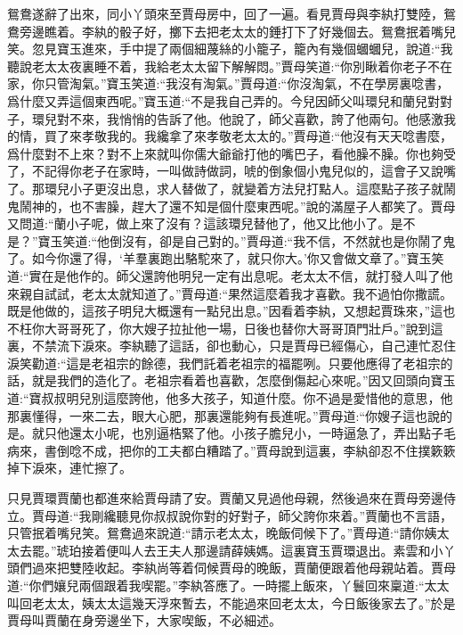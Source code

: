 \begin{parag}
    鴛鴦遂辭了出來，同小丫頭來至賈母房中，回了一遍。看見賈母與李紈打雙陸，鴛鴦旁邊瞧着。李紈的骰子好，擲下去把老太太的錘打下了好幾個去。鴛鴦抿着嘴兒笑。忽見寶玉進來，手中提了兩個細蔑絲的小籠子，籠內有幾個蟈蟈兒，說道:“我聽說老太太夜裏睡不着，我給老太太留下解解悶。”賈母笑道:“你別瞅着你老子不在家，你只管淘氣。”寶玉笑道:“我沒有淘氣。”賈母道:“你沒淘氣，不在學房裏唸書，爲什麼又弄這個東西呢。”寶玉道:“不是我自己弄的。今兒因師父叫環兒和蘭兒對對子，環兒對不來，我悄悄的告訴了他。他說了，師父喜歡，誇了他兩句。他感激我的情，買了來孝敬我的。我纔拿了來孝敬老太太的。”賈母道:“他沒有天天唸書麼，爲什麼對不上來？對不上來就叫你儒大爺爺打他的嘴巴子，看他臊不臊。你也夠受了，不記得你老子在家時，一叫做詩做詞，唬的倒象個小鬼兒似的，這會子又說嘴了。那環兒小子更沒出息，求人替做了，就變着方法兒打點人。這麼點子孩子就鬧鬼鬧神的，也不害臊，趕大了還不知是個什麼東西呢。”說的滿屋子人都笑了。賈母又問道:“蘭小子呢，做上來了沒有？這該環兒替他了，他又比他小了。是不是？”寶玉笑道:“他倒沒有，卻是自己對的。”賈母道:“我不信，不然就也是你鬧了鬼了。如今你還了得，‘羊羣裏跑出駱駝來了，就只你大。’你又會做文章了。”寶玉笑道:“實在是他作的。師父還誇他明兒一定有出息呢。老太太不信，就打發人叫了他來親自試試，老太太就知道了。”賈母道:“果然這麼着我才喜歡。我不過怕你撒謊。既是他做的，這孩子明兒大概還有一點兒出息。”因看着李紈，又想起賈珠來，”這也不枉你大哥哥死了，你大嫂子拉扯他一場，日後也替你大哥哥頂門壯戶。”說到這裏，不禁流下淚來。李紈聽了這話，卻也動心，只是賈母已經傷心，自己連忙忍住淚笑勸道:“這是老祖宗的餘德，我們託着老祖宗的福罷咧。只要他應得了老祖宗的話，就是我們的造化了。老祖宗看着也喜歡，怎麼倒傷起心來呢。”因又回頭向寶玉道:“寶叔叔明兒別這麼誇他，他多大孩子，知道什麼。你不過是愛惜他的意思，他那裏懂得，一來二去，眼大心肥，那裏還能夠有長進呢。”賈母道:“你嫂子這也說的是。就只他還太小呢，也別逼梏緊了他。小孩子膽兒小，一時逼急了，弄出點子毛病來，書倒唸不成，把你的工夫都白糟踏了。”賈母說到這裏，李紈卻忍不住撲簌簌掉下淚來，連忙擦了。
\end{parag}


\begin{parag}
    只見賈環賈蘭也都進來給賈母請了安。賈蘭又見過他母親，然後過來在賈母旁邊侍立。賈母道:“我剛纔聽見你叔叔說你對的好對子，師父誇你來着。”賈蘭也不言語，只管抿着嘴兒笑。鴛鴦過來說道:“請示老太太，晚飯伺候下了。”賈母道:“請你姨太太去罷。”琥珀接着便叫人去王夫人那邊請薛姨媽。這裏寶玉賈環退出。素雲和小丫頭們過來把雙陸收起。李紈尚等着伺候賈母的晚飯，賈蘭便跟着他母親站着。賈母道:“你們孃兒兩個跟着我喫罷。”李紈答應了。一時擺上飯來，丫鬟回來稟道:“太太叫回老太太，姨太太這幾天浮來暫去，不能過來回老太太，今日飯後家去了。”於是賈母叫賈蘭在身旁邊坐下，大家喫飯，不必細述。
\end{parag}


